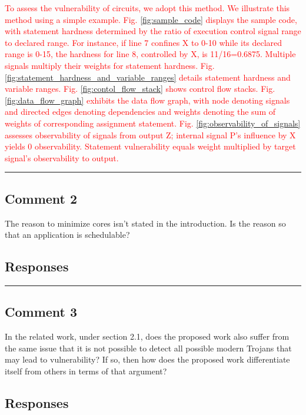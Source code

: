 \documentclass[10pt,journal, compsoc]{IEEEtran}
\begin{document}
\textcolor{red}{To assess the vulnerability of circuits, we adopt this method. We illustrate this method using a simple example. Fig. \ref{fig:sample_code} displays the sample code, with statement hardness determined by the ratio of execution control signal range to declared range. For instance, if line 7 confines X to 0-10 while its declared range is 0-15, the hardness for line 8, controlled by X, is 11/16=0.6875. Multiple signals multiply their weights for statement hardness. Fig. \ref{fig:statement_hardness_and_variable_ranges} details statement hardness and variable ranges. Fig. \ref{fig:contol_flow_stack} shows control flow stacks. Fig. \ref{fig:data_flow_graph} exhibits the data flow graph, with node denoting signals and directed edges denoting dependencies and weights denoting the sum of weights of corresponding assignment statement. Fig. \ref{fig:observability_of_signals} assesses observability of signals from output Z; internal signal P's influence by X yields 0 observability. Statement vulnerability equals weight multiplied by target signal's observability to output.}

\noindent\rule[0.25\baselineskip]{252pt}{1pt}

\subsection*{Comment 2}
The reason to minimize cores isn't stated in the introduction. Is the reason so that an application is schedulable?

\subsection*{Responses}


\noindent\rule[0.25\baselineskip]{252pt}{1pt}

\subsection*{Comment 3}
In the related work, under section 2.1, does the proposed work also suffer from the same issue that it is not possible to detect all possible modern Trojans that may lead to vulnerability?  If so, then how does the proposed work differentiate itself from others in terms of that argument?

\subsection*{Responses}
\end{document}
